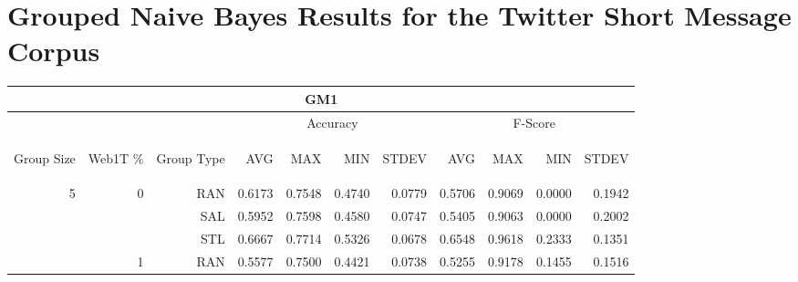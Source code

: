 \chapter{Grouped Naive Bayes Results for the Twitter Short Message Corpus}

\begin{center}
\begin{table}[htbp] 
 \begin{center}
\begin{tabular}{ | r | r | r | r | r | r | r | r | r | r | r |}
\hline
\multicolumn{11}{|c|}{GM1}\\
\hline
 & & & \multicolumn{4}{|c|}{Accuracy} & \multicolumn{4}{|c|}{F-Score}\\ \cline{4-11}
\begin{sideways}Group Size\end{sideways} & \begin{sideways}Web1T \%\end{sideways} & \begin{sideways}Group Type\end{sideways} & \begin{sideways}AVG\end{sideways} & \begin{sideways}MAX\end{sideways} & \begin{sideways}MIN\end{sideways} & \begin{sideways}STDEV\end{sideways} & \begin{sideways}AVG\end{sideways} & \begin{sideways}MAX\end{sideways} & \begin{sideways}MIN\end{sideways} & \begin{sideways}STDEV\end{sideways}\\
\hline
\multirow{18}{*}{5}
 & \multirow{3}{*}{0} & RAN & 0.6173 & 0.7548 & 0.4740 & 0.0779 & 0.5706 & 0.9069 & 0.0000 & 0.1942\\ \cline{3-11}
 &   & SAL & 0.5952 & 0.7598 & 0.4580 & 0.0747 & 0.5405 & 0.9063 & 0.0000 & 0.2002\\ \cline{3-11}
 &   & STL & 0.6667 & 0.7714 & 0.5326 & 0.0678 & 0.6548 & 0.9618 & 0.2333 & 0.1351\\ \cline{2-11}
 & \multirow{3}{*}{1} & RAN & 0.5577 & 0.7500 & 0.4421 & 0.0738 & 0.5255 & 0.9178 & 0.1455 & 0.1516\\ \cline{3-11}

\end{tabular}
\end{center}
\end{table}
\end{center}
